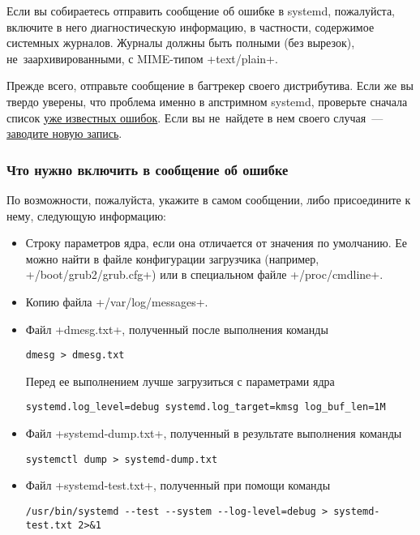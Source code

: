 \documentclass[10pt,oneside,a4paper]{article}
\begin{document}
Если вы собираетесь отправить сообщение об ошибке в systemd, пожалуйста,
включите в него диагностическую информацию, в частности, содержимое системных
журналов. Журналы должны быть полными (без вырезок), не~заархивированными, с
MIME-типом +text/plain+.

Прежде всего, отправьте сообщение в багтрекер своего дистрибутива. Если же вы
твердо уверены, что проблема именно в апстримном systemd, проверьте сначала
список
\href{https://bugs.freedesktop.org/buglist.cgi?query_format=advanced&bug_status=NEW&bug_status=ASSIGNED&bug_status=REOPENED&product=systemd}{уже
известных ошибок}. Если вы не~найдете в нем своего случая~---
\href{https://bugs.freedesktop.org/enter_bug.cgi?product=systemd}{заводите новую
запись}.

\subsubsection{Что нужно включить в сообщение об ошибке}

По возможности, пожалуйста, укажите в самом сообщении, либо присоедините к нему,
следующую информацию:
\begin{itemize}
	\item Строку параметров ядра, если она отличается от значения по
		умолчанию. Ее можно найти в файле конфигурации загрузчика
		(например, +/boot/grub2/grub.cfg+) или в специальном файле
		+/proc/cmdline+.
	\item Копию файла +/var/log/messages+.
	\item Файл +dmesg.txt+, полученный после выполнения команды
\begin{Verbatim}		
dmesg > dmesg.txt
\end{Verbatim}
		Перед ее выполнением лучше загрузиться с параметрами ядра
\begin{Verbatim}
systemd.log_level=debug systemd.log_target=kmsg log_buf_len=1M
\end{Verbatim}
	\item Файл +systemd-dump.txt+, полученный в результате выполнения
		команды 
\begin{Verbatim}
systemctl dump > systemd-dump.txt
\end{Verbatim}
	\item Файл +systemd-test.txt+, полученный при помощи команды
\begin{Verbatim}
/usr/bin/systemd --test --system --log-level=debug > systemd-test.txt 2>&1
\end{Verbatim}
\end{itemize}
\end{document}
